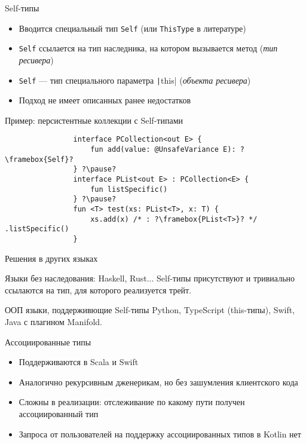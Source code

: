 \documentclass[aspectratio=169,usenames,dvipsnames]{beamer}
\begin{document}
    \begin{frame}[fragile]{Self-типы}

        \begin{itemize}
            \item Вводится специальный тип \texttt{Self} (или \texttt{ThisType} в литературе)
            \item \texttt{Self} ссылается на тип наследника, на котором вызывается метод (\emph{тип ресивера})
            \item \texttt{Self} --- тип специального параметра \texttt|this| (\emph{объекта ресивера})
            \item Подход не имеет описанных ранее недостатков
        \end{itemize}

        \pause

        \begin{block}{Пример: персистентные коллекции с Self-типами}
            \begin{verbatim}
                interface PCollection<out E> {
                    fun add(value: @UnsafeVariance E): ?\framebox{Self}?
                } ?\pause?
                interface PList<out E> : PCollection<E> {
                    fun listSpecific()
                } ?\pause?
                fun <T> test(xs: PList<T>, x: T) {
                    xs.add(x) /* : ?\framebox{PList<T>}? */ .listSpecific()
                }
            \end{verbatim}
        \end{block}
    \end{frame}

    \begin{frame}[fragile]{Решения в других языках}

        \begin{block}{Языки без наследования: Haskell, Rust...}
            Self-типы присутствуют и тривиально ссылаются на тип, для которого реализуется трейт.
        \end{block}

        \begin{block}{ООП языки, поддерживющие Self-типы}
            Python, TypeScript (this-типы), Swift, Java с плагином Manifold.
        \end{block}

        \begin{block}{Ассоциированные типы}
            \begin{itemize}
                \item Поддерживаются в Scala и Swift
                \item Аналогично рекурсивным дженерикам, но без зашумления клиентского кода
                \item Сложны в реализации: отслеживание по какому пути получен ассоциированный тип
                \item Запроса от пользователей на поддержку ассоциированных типов в Kotlin нет
            \end{itemize}
        \end{block}
    \end{frame}
\end{document}
